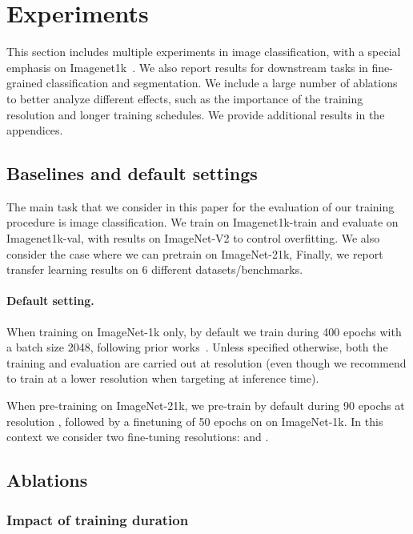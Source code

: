 \section{Experiments}
This section includes multiple experiments in image classification, with a special emphasis on Imagenet1k~\cite{deng2009imagenet,Recht2019ImageNetv2,Russakovsky2015ImageNet12}. We also report results for  downstream tasks in fine-grained classification and segmentation. 
We include a large number of ablations to better analyze different effects, such as the importance of the training resolution and longer training schedules. We provide additional results in the appendices. 

\subsection{Baselines and default settings}
 
The main task that we consider in this paper for the evaluation of our training procedure is image classification. 
We train on Imagenet1k-train and evaluate on Imagenet1k-val, with results on ImageNet-V2 to control  overfitting. 
We also consider the case where we can pretrain  on ImageNet-21k, 
Finally, we report transfer learning results on 6 different datasets/benchmarks. 

\paragraph{Default setting. }
When training on ImageNet-1k only,  by default we train during 400 epochs with a batch size 2048, following prior works~\cite{touvron2021going,xiao2021early}. 
Unless specified otherwise, both the training and evaluation are carried out at resolution  (even though we recommend to train at a lower resolution when targeting  at inference time). 

When pre-training on ImageNet-21k, we pre-train by default during 90 epochs at resolution , followed by a finetuning of 50 epochs on on ImageNet-1k. In this context we consider two fine-tuning resolutions:  and . 

\subsection{Ablations}


\subsubsection{Impact of training duration}

